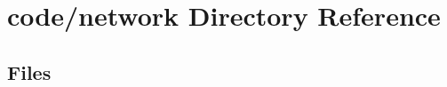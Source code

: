 \section{code/network Directory Reference}
\label{dir_2b1a7c2e04eadb85f7b35555cb03d609}
\subsection*{Files}
\begin{DoxyCompactItemize}
\end{DoxyCompactItemize}
